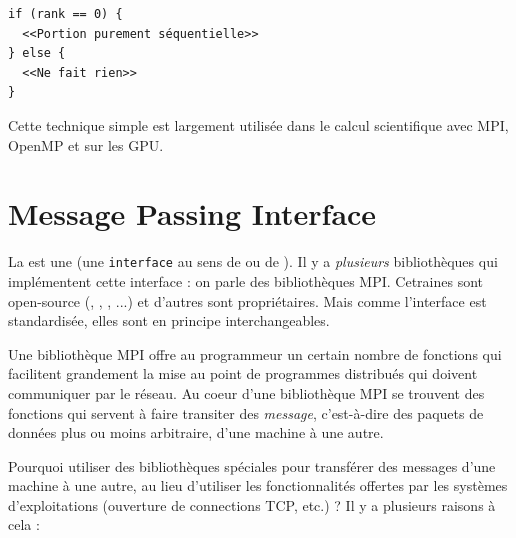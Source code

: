 \begin{verbatim}
if (rank == 0) {
  <<Portion purement séquentielle>>
} else {
  <<Ne fait rien>>
}
\end{verbatim}

Cette technique simple est largement utilisée dans le calcul scientifique avec
\textsf{MPI}, \textsf{OpenMP} et sur les GPU.






\chapter{Message Passing Interface}
\label{chap:mpi}

La  est une  (une
\texttt{interface} au sens de  ou de ). Il y a
\emph{plusieurs} bibliothèques qui implémentent cette interface : on parle des
bibliothèques MPI. Cetraines sont open-source (,
, , ...) et d'autres sont propriétaires. Mais
comme l'interface est standardisée, elles sont en principe interchangeables.

Une bibliothèque MPI offre au programmeur un certain nombre de fonctions
qui facilitent grandement la mise au point de programmes distribués
qui doivent communiquer par le réseau. Au coeur d'une bibliothèque MPI se
trouvent des fonctions qui servent à faire transiter des
\emph{message}, c'est-à-dire des paquets de données plus ou moins
arbitraire, d'une machine à une autre.

Pourquoi utiliser des bibliothèques spéciales pour transférer des
messages d'une machine à une autre, au lieu d'utiliser les
fonctionnalités offertes par les systèmes d'exploitations (ouverture
de connections TCP, etc.) ? Il y a plusieurs raisons à cela :

